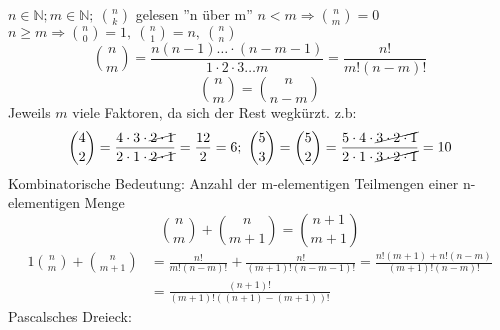 $n \in \mathbb{N}; m \in \mathbb{N};\ \binom{n}{k}$  gelesen ''n über m'' $n < m \Rightarrow \binom{n}{m} = 0$ $n \geq m \Rightarrow \binom{n}{0} = 1,\ \binom{n}{1} = n,\ \binom{n}{n}$
\[\binom{n}{m} = \frac{n(n-1) \dots \cdot (n-m-1)}{1\cdot 2\cdot3 \dots m} = \frac{n!}{m!(n-m)!}\]
\[\binom{n}{m}=\binom{n}{n-m}\] Jeweils $m$ viele Faktoren, da sich der Rest wegkürzt.
z.b:
\[\binom{4}{2} = \frac{4 \cdot 3 \cdot \cancel{2 \cdot 1}}{2 \cdot 1 \cdot \cancel{2 \cdot 1}} = \frac{12}{2} = 6;\ \binom{5}{3} = \binom{5}{2} = \frac{5 \cdot 4 \cdot  \cancel{3 \cdot 2 \cdot 1}}{2 \cdot 1 \cdot \cancel{3 \cdot 2 \cdot 1}} = 10\]
Kombinatorische Bedeutung: Anzahl der m-elementigen Teilmengen einer n-elementigen Menge
\[\binom{n}{m}+\binom{n}{m+1}=\binom{n+1}{m+1}\]
\begin{alignat*}{1}
    \binom{n}{m}+\binom{n}{m+1} & =\frac{n!}{m!(n-m)!}+\frac{n!}{(m+1)!(n-m-1)!}=\frac{n!(m+1)+n!(n-m)}{(m+1)!(n-m)!} \\
    & =\frac{(n+1)!}{(m+1)!((n+1)-(m+1))!}
\end{alignat*}
Pascalsches Dreieck: \\
